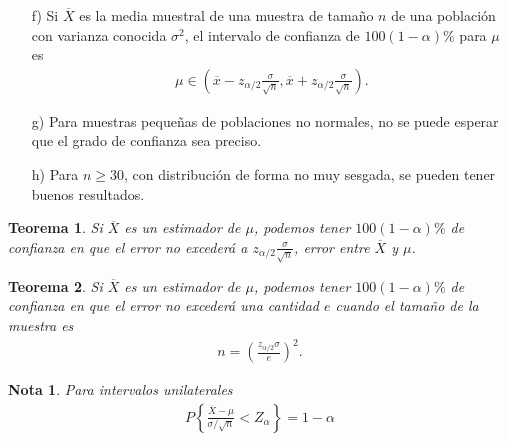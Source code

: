\documentclass[a4paper]{report} %
\newtheorem{Teo}{Teorema}[chapter]
\newtheorem{Note}{Nota}[chapter]
\begin{document}
\begin{enumerate}
\item[f) ]Si $\overline{X}$ es la media muestral de una muestra de tama\~no $n$ de una poblaci\'on con varianza conocida $\sigma^{2}$, el intervalo de confianza de $100\left(1-\alpha\right)\%$ para $\mu$ es \begin{eqnarray}\mu\in\left(\overline{x}-z_{\alpha/2}\frac{\sigma}{\sqrt{n}},\overline{x}+z_{\alpha/2}\frac{\sigma}{\sqrt{n}}\right).\end{eqnarray}

\item[g) ] Para muestras peque\~nas de poblaciones no normales, no se puede esperar que el grado de confianza sea preciso.
\item[h) ] Para $n\geq30$, con distribuci\'on de forma no muy sesgada, se pueden tener buenos resultados.
\end{enumerate}

\begin{Teo}
Si $\overline{X}$ es un estimador de $\mu$, podemos tener $100\left(1-\alpha\right)\%$  de confianza en que el error no exceder\'a a $z_{\alpha/2}\frac{\sigma}{\sqrt{n}}$, error entre $\overline{X}$ y $\mu$.
\end{Teo}

\begin{Teo}
Si $\overline{X}$ es un estimador de $\mu$, podemos tener $100\left(1-\alpha\right)\%$  de confianza en que el error no exceder\'a una cantidad $e$ cuando el tama\~no de la muestra es \begin{eqnarray}n=\left(\frac{z_{\alpha/2}\sigma}{e}\right)^{2}.\end{eqnarray}
\end{Teo}
\begin{Note}
Para intervalos unilaterales
\begin{eqnarray}P\left\{\frac{\overline{X}-\mu}{\sigma/\sqrt{n}}<Z_{\alpha}\right\}=1-\alpha\end{eqnarray}
\end{Note}
\end{document}
